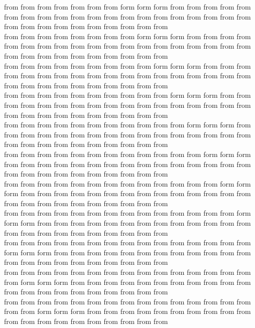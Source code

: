from from from from from from from form form form from from from from from from from from from from from from from from from from from from from from from from from from from from from from from from\\
from from from from from from from from form form form from from from from from from from from from from from from from from from from from from from from from from from from from from from from from\\
from from from from from from from from from form form form from from from from from from from from from from from from from from from from from from from from from from from from from from from from\\
from from from from from from from from from from form form form from from from from from from from from from from from from from from from from from from from from from from from from from from from\\
from from from from from from from from from from from form form form from from from from from from from from from from from from from from from from from from from from from from from from from from\\
from from from from from from from from from from from from form form form from from from from from from from from from from from from from from from from from from from from from from from from from\\
from from from from from from from from from from from from from form form form from from from from from from from from from from from from from from from from from from from from from from from from\\
from from from from from from from from from from from from from from form form form from from from from from from from from from from from from from from from from from from from from from from from\\
from from from from from from from from from from from from from from from form form form from from from from from from from from from from from from from from from from from from from from from from\\
from from from from from from from from from from from from from from from from form form form from from from from from from from from from from from from from from from from from from from from from\\
from from from from from from from from from from from from from from from from from form form form from from from from from from from from from from from from from from from from from from from from\\
